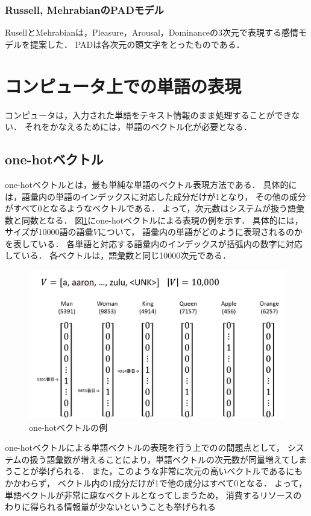 		\subsubsection{Russell, MehrabianのPADモデル}
			RusellとMehrabian\cite{russell_3D}は，Pleasure，Arousal，Dominanceの3次元で表現する感情モデルを提案した．
			PADは各次元の頭文字をとったものである．

\section{コンピュータ上での単語の表現}
	コンピュータは，入力された単語をテキスト情報のまま処理することができない．
	それをかなえるためには，単語のベクトル化が必要となる．

	\subsection{one-hotベクトル}
		one-hotベクトルとは，最も単純な単語のベクトル表現方法である．
		具体的には，語彙内の単語のインデックスに対応した成分だけが1となり，
		その他の成分がすべて0となるようなベクトルである．
		よって，次元数はシステムが扱う語彙数と同数となる．
		図\ref{fig:one-hot-vector}にone-hotベクトルによる表現の例を示す．
		具体的には，サイズが10000語の語彙$V$について，
		語彙内の単語がどのように表現されるのかを表している．
		各単語と対応する語彙内のインデックスが括弧内の数字に対応している．
		各ベクトルは，語彙数と同じ10000次元である．
		\begin{figure}[H]
			\centering
			\includegraphics[width=\linewidth]{./figure/one-hot-vector.png}
			\caption{one-hotベクトルの例}
			\label{fig:one-hot-vector}
		\end{figure}

		one-hotベクトルによる単語ベクトルの表現を行う上でのの問題点として，
		システムの扱う語彙数が増えることにより，単語ベクトルの次元数が同量増えてしまうことが挙げられる．
		また，このような非常に次元の高いベクトルであるにもかかわらず，
		ベクトル内の1成分だけが1で他の成分はすべて0となる．
		よって，単語ベクトルが非常に疎なベクトルとなってしまうため，
		消費するリソースのわりに得られる情報量が少ないということも挙げられる

